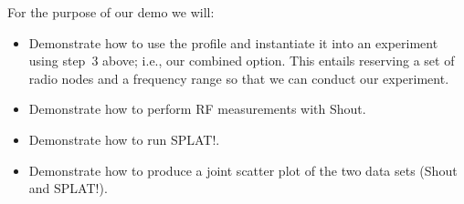 \documentclass[10pt]{article}
\begin{document}
For the purpose of our demo we will:
\begin{itemize}
\item Demonstrate how to use the profile and instantiate it into an experiment using step~3 
above; i.e., our combined option. This entails reserving a set of radio nodes and a
frequency range so that we can conduct our experiment. 
\item Demonstrate how to perform RF measurements with Shout.
\item Demonstrate how to run SPLAT!.
\item Demonstrate how to produce a joint scatter plot of the two data sets (Shout and SPLAT!). 
\end{itemize}




\end{document}
